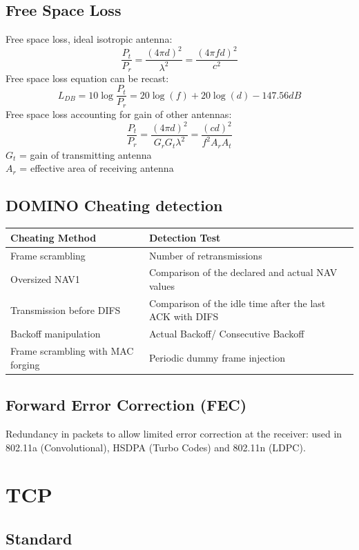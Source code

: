 \documentclass[6pt]{scrartcl}
\begin{document}
\begin{multicols}{4}
\subsection{Free Space Loss}

Free space loss, ideal isotropic antenna:
$$ \frac{P_t}{P_r} = \frac{(4\pi d)^2}{\lambda^2} = \frac{(4\pi fd)^2}{c^2} $$
Free space loss equation can be recast:
$$L_{DB} = 10\log \frac{P_t}{P_r} = 20 \log(f) +20\log(d) - 147.56 dB$$
Free space loss accounting for gain of other antennas: 
$$\frac{P_t}{P_r} = \frac{(4\pi d)^2}{G_rG_t\lambda^2} = \frac{(cd)^2}{f^2A_rA_t}$$
$G_t$ = gain of transmitting antenna\\
$A_r$ = effective area of receiving antenna



\subsection{DOMINO Cheating detection}
\begin{tabular}{|p{}|p{}|}
  \hline
  Cheating Method & Detection Test \\\hline
  Frame scrambling & Number of retransmissions \\
  Oversized NAV1 & Comparison of the declared and actual NAV values\\
  Transmission before DIFS & Comparison of the idle time after the last ACK with DIFS \\
  Backoff manipulation & Actual Backoff/ Consecutive Backoff \\
  Frame scrambling with MAC forging & Periodic dummy frame injection\\
   \hline
\end{tabular}

\subsection{Forward Error Correction (FEC)}
Redundancy in packets to allow limited error correction at the receiver: used in 802.11a (Convolutional), HSDPA (Turbo Codes) and 802.11n (LDPC).

\section{TCP}

\subsection{Standard}


\end{multicols}
\end{document}
